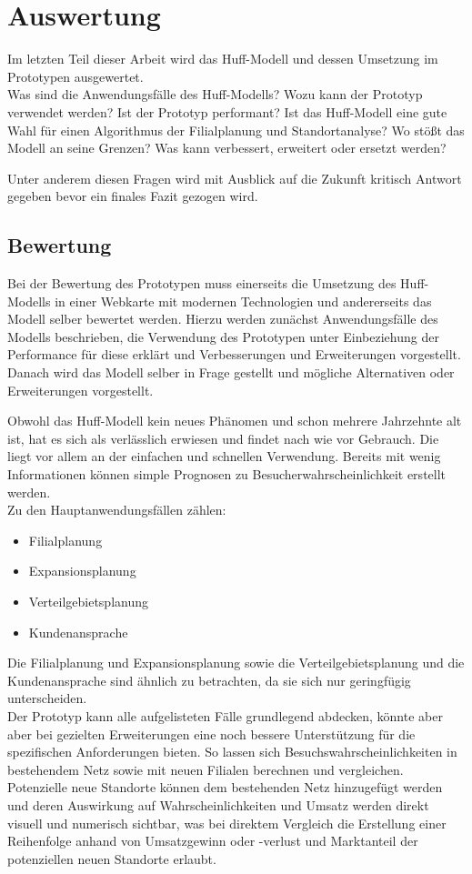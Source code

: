 \chapter{Auswertung}
Im letzten Teil dieser Arbeit wird das Huff-Modell und dessen Umsetzung im Prototypen ausgewertet.\\
Was sind die Anwendungsfälle des Huff-Modells?
Wozu kann der Prototyp verwendet werden?
Ist der Prototyp performant?
Ist das Huff-Modell eine gute Wahl für einen Algorithmus der Filialplanung und Standortanalyse?
Wo stößt das Modell an seine Grenzen?
Was kann verbessert, erweitert oder ersetzt werden?

Unter anderem diesen Fragen wird mit Ausblick auf die Zukunft kritisch Antwort gegeben bevor ein finales Fazit gezogen wird.

\section{Bewertung}
\label{sec:bewertung}
Bei der Bewertung des Prototypen muss einerseits die Umsetzung des Huff-Modells in einer Webkarte mit modernen Technologien und andererseits das Modell selber bewertet werden.
Hierzu werden zunächst Anwendungsfälle des Modells beschrieben, die Verwendung des Prototypen unter Einbeziehung der Performance für diese erklärt und Verbesserungen und Erweiterungen vorgestellt.
Danach wird das Modell selber in Frage gestellt und mögliche Alternativen oder Erweiterungen vorgestellt.

Obwohl das Huff-Modell kein neues Phänomen und schon mehrere Jahrzehnte alt ist, hat es sich als verlässlich erwiesen und findet nach wie vor Gebrauch.
Die liegt vor allem an der einfachen und schnellen Verwendung. 
Bereits mit wenig Informationen können simple Prognosen zu Besucherwahrscheinlichkeit erstellt werden.\\
Zu den Hauptanwendungsfällen zählen:

\begin{itemize}
	\item Filialplanung
	\item Expansionsplanung
	\item Verteilgebietsplanung
	\item Kundenansprache
\end{itemize}

Die Filialplanung und Expansionsplanung sowie die Verteilgebietsplanung und die Kundenansprache sind ähnlich zu betrachten, da sie sich nur geringfügig unterscheiden.\\
Der Prototyp kann alle aufgelisteten Fälle grundlegend abdecken, könnte aber aber bei gezielten Erweiterungen eine noch bessere Unterstützung für die spezifischen Anforderungen bieten.
So lassen sich Besuchswahrscheinlichkeiten in bestehendem Netz sowie mit neuen Filialen berechnen und vergleichen.
Potenzielle neue Standorte können dem bestehenden Netz hinzugefügt werden und deren Auswirkung auf Wahrscheinlichkeiten und Umsatz werden direkt visuell und numerisch sichtbar, was bei direktem Vergleich die Erstellung einer Reihenfolge anhand von Umsatzgewinn oder -verlust und Marktanteil der potenziellen neuen Standorte erlaubt.\\ 

